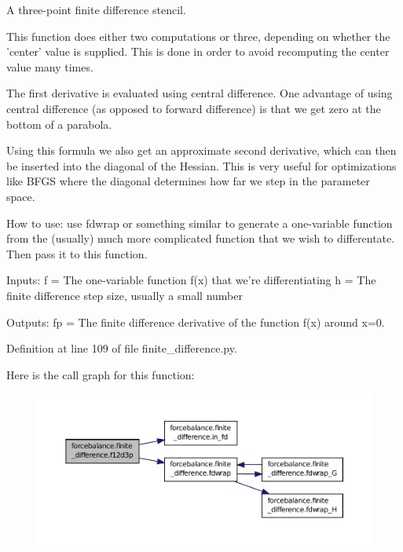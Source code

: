 A three-\/point finite difference stencil. 

This function does either two computations or three, depending on whether the 'center' value is supplied. This is done in order to avoid recomputing the center value many times.

The first derivative is evaluated using central difference. One advantage of using central difference (as opposed to forward difference) is that we get zero at the bottom of a parabola.

Using this formula we also get an approximate second derivative, which can then be inserted into the diagonal of the Hessian. This is very useful for optimizations like B\-F\-G\-S where the diagonal determines how far we step in the parameter space.

How to use\-: use fdwrap or something similar to generate a one-\/variable function from the (usually) much more complicated function that we wish to differentate. Then pass it to this function.

Inputs\-: f = The one-\/variable function f(x) that we're differentiating h = The finite difference step size, usually a small number

Outputs\-: fp = The finite difference derivative of the function f(x) around x=0. 

Definition at line 109 of file finite\-\_\-difference.\-py.



Here is the call graph for this function\-:\nopagebreak
\begin{figure}[H]
\begin{center}
\leavevmode
\includegraphics[width=350pt]{namespaceforcebalance_1_1finite__difference_aa69a8819e4680091f400303c1d6ddeb7_cgraph}
\end{center}
\end{figure}



